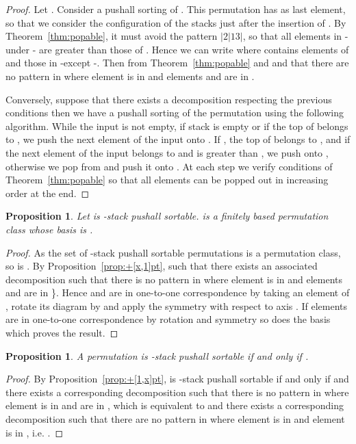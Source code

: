 \documentclass[11pt]{article}
\newtheorem{prop}[thm]{Proposition}
\newcommand{\patternVH}{\ensuremath{|2|13|}\xspace}
\newcommand{\pushall}{-stack pushall sortable\xspace}
\begin{document}
\begin{proof}
Let . 
Consider a pushall sorting of . 
This permutation has  as last element, so that we consider the configuration of the stacks just after the insertion of . 
By Theorem~\ref{thm:popable}, it must avoid the pattern \patternVH, so that all elements in  -under - are greater than those of .
Hence we can write  where  contains elements of  and  those in  -except -.
Then from Theorem~\ref{thm:popable}  and  and that there are no pattern  in  where element  is in  and elements  and  are in .

Conversely, suppose that there exists a decomposition  respecting the previous conditions then we have a pushall sorting of the permutation  using the following algorithm.
While the input is not empty, if stack  is empty or if the top of  belongs to , we push the next element of the input onto . 
If , the top of  belongs to , and if the next element of the input  belongs to  and is greater than , we push  onto , otherwise we pop  from  and push it onto . 
At each step we verify conditions of Theorem~\ref{thm:popable} so that all elements can be popped out in increasing order at the end.
\end{proof}


\begin{prop}
\label{prop:B3}
Let  is \pushall . 
 is a finitely based permutation class whose basis is .
\end{prop}
\begin{proof}
As the set of \pushall permutations is a permutation class, so is . 
By Proposition~\ref{prop:+[x,1]pt},  such that there exists an associated decomposition  such that there is no pattern  in  where element  is in  and elements  and  are in \}.
Hence  and  are in one-to-one correspondence by taking an element of , rotate its diagram by  and apply the symmetry with respect to axis . 
If elements are in one-to-one correspondence by rotation and symmetry so does the basis which proves the result.
\end{proof}


\begin{prop}
\label{prop:+[1,x,1]pt}
A permutation  is \pushall if and only if .
\end{prop}
\begin{proof}
By Proposition~\ref{prop:+[1,x]pt},  is \pushall if and only if  and there exists a corresponding decomposition  such that there is no pattern  in  where element  is in  and  are in , which is equivalent to  and there exists a corresponding decomposition  such that there are no pattern  in  where element  is in  and element  is in , i.e. .
\end{proof}
\end{document}
